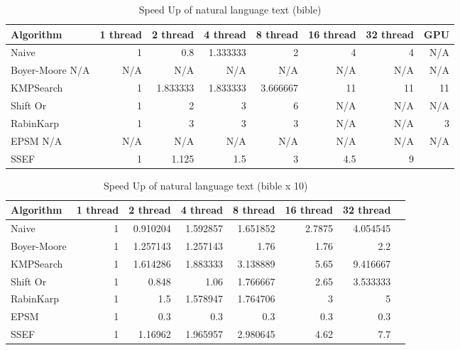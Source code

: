 \documentclass[11pt]{article}       %
\begin{document}
\begin{table}[htbp]
  \centering
  \caption{Speed Up of natural language text (bible)}
    \begin{tabular}{lrrrrrrr}\label{t7}
Algorithm & 1 thread & 2 thread & 4 thread & 8 thread & 16 thread & 32 thread & GPU \\
 \hline
    Naive & 1     & 0.8   & 1.333333 & 2     & 4     & 4     &  N/A \\
    {Boyer-Moore} N/A &  N/A     &  N/A     &  N/A     &  N/A     &  N/A     &  N/A     &  N/A \\
    KMPSearch & 1     & 1.833333 & 1.833333 & 3.666667 & 11    & 11    & 11 \\
    Shift Or & 1     & 2     & 3     & 6     &    N/A   &    N/A    &  N/A \\
    RabinKarp & 1     & 3     & 3     & 3     &    N/A    &     N/A   & 3 \\
    EPSM  N/A &  N/A     & N/A     &  N/A     &  N/A     &  N/A    &  N/A   &  N/A \\
    SSEF  & 1     & 1.125 & 1.5   & 3     & 4.5   & 9     &  \\
    \end{tabular}%
  \label{tab:addlabel}%
\end{table}%
\begin{table}[htbp]
  \centering
  \caption{Speed Up of natural language text (bible x 10)}
    \begin{tabular}{lrrrrrrr}\label{t11}
Algorithm & 1 thread & 2 thread & 4 thread & 8 thread & 16 thread & 32 thread \\
 \hline
    Naive & 1     & 0.910204 & 1.592857 & 1.651852 & 2.7875 & 4.054545 \\
    Boyer-Moore & 1     & 1.257143 & 1.257143 & 1.76  & 1.76  & 2.2 \\
    KMPSearch & 1     & 1.614286 & 1.883333 & 3.138889 & 5.65  & 9.416667 \\
    Shift Or & 1     & 0.848 & 1.06  & 1.766667 & 2.65  & 3.533333 \\
    RabinKarp & 1     & 1.5   & 1.578947 & 1.764706 & 3     & 5 \\
    EPSM  & 1     & 0.3   & 0.3   & 0.3   & 0.3   & 0.3 \\
    SSEF  & 1     & 1.16962 & 1.965957 & 2.980645 & 4.62  & 7.7 \\
    \end{tabular}%
  \label{tab:addlabel}%
\end{table}%
\end{document}
